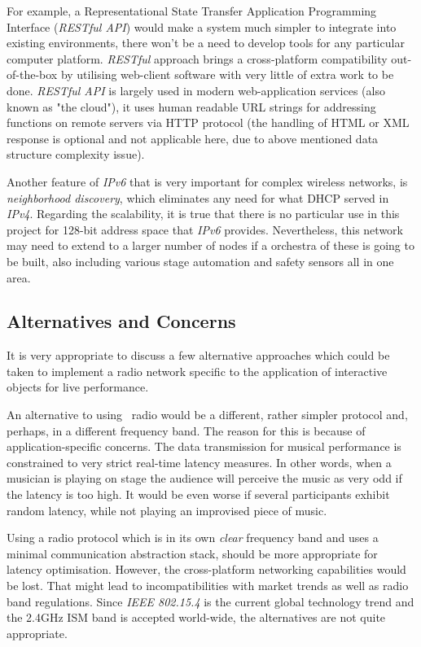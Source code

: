  For example, a Representational State Transfer Application Programming
 Interface (\emph{RESTful API}) \cite{links:wiki:rest} would make a
 system much simpler to integrate into existing environments,
 there won't be a need to develop tools for any particular computer platform.
 \emph{RESTful} approach brings a cross-platform compatibility out-of-the-box
 by utilising web-client software with very little of extra work to be done.
 \emph{RESTful API} is largely used in modern web-application services
 (also known as "the cloud"), it uses human readable URL strings for
 addressing functions on remote servers via HTTP protocol (the handling
 of HTML or XML response is optional and not applicable here, due to above
 mentioned data structure complexity issue).

 Another feature of \emph{IPv6} that is very important for complex wireless
 networks, is \emph{neighborhood discovery}, which eliminates any need
 for what DHCP served in \emph{IPv4}. Regarding the scalability,
 it is true that there is no particular use in this project for 128-bit
 address space that \emph{IPv6} provides. Nevertheless, this network
 may need to extend to a larger number of nodes if a orchestra of these
 is going to be built, also including various stage automation and
 safety sensors all in one area.


\subsection{Alternatives and Concerns}

  It is very appropriate to discuss a few alternative approaches which
 could be taken to implement a radio network specific to the application
 of interactive objects for live performance.

  An alternative to using \WPAN\ radio would be a different, rather
 simpler protocol and, perhaps, in a different frequency band.
 The reason for this is because of application-specific concerns.
 The data transmission for musical performance is constrained
 to very strict real-time latency measures. In other words, when a
 musician is playing on stage the audience will perceive the music as
 very odd if the latency is too high. It would be even worse if several
 participants exhibit random latency, while not playing an improvised
 piece of music.

  Using a radio protocol which is in its own \emph{clear} frequency
 band and uses a minimal communication abstraction stack, should be
 more appropriate for latency optimisation. However, the cross-platform
 networking capabilities would be lost. That might lead to incompatibilities
 with market trends as well as radio band regulations.
  Since \emph{IEEE 802.15.4} is the current global technology trend and
 the 2.4GHz ISM band is accepted world-wide, the alternatives are not
 quite appropriate.

